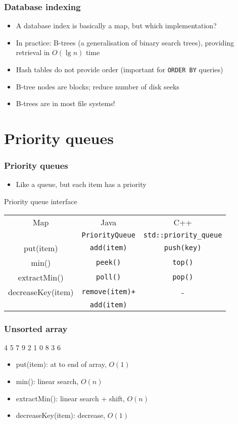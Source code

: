 \documentclass{beamer}
\begin{document}
\begin{frame}
 \frametitle{Database indexing}
 \begin{itemize}
  \item A database index is basically a map, but which implementation?
  \item In practice: B-trees (a generalisation of binary search trees),
        providing retrieval in $O(\lg n)$ time
  \item Hash tables do not provide order (important for \texttt{ORDER BY}
        queries)
  \item B-tree nodes are blocks; reduce number of disk seeks
  \item B-trees are in most file systems!
 \end{itemize}
\end{frame}

\section{Priority queues}

\begin{frame}
 \frametitle{Priority queues}
 \begin{itemize}
  \item Like a queue, but each item has a priority
 \end{itemize}
 \begin{center}
 Priority queue interface \\
 \vspace{0.5cm}
 \begin{tabular}{c|c|c}
  Map & Java & C++ \\
  & \texttt{PriorityQueue} & \texttt{std::priority\_queue} \\
  \hline
  put(item) & \texttt{add(item)} & \texttt{push(key)} \\
  min() & \texttt{peek()} & \texttt{top()} \\
  extractMin() & \texttt{poll()} & \texttt{pop()} \\
  decreaseKey(item) & \texttt{remove(item)+} & - \\
  & \texttt{add(item)} & \\
 \end{tabular}
 \end{center}
\end{frame}

\begin{frame}
 \frametitle{Unsorted array}
 \begin{center}
  4 5 7 9 2 1 0 8 3 6
 \end{center}
 \begin{itemize}
  \item put(item): at to end of array, $O(1)$
  \item min(): linear search, $O(n)$
  \item extractMin(): linear search + shift, $O(n)$
  \item decreaseKey(item): decrease, $O(1)$
 \end{itemize}
\end{frame}
\end{document}

